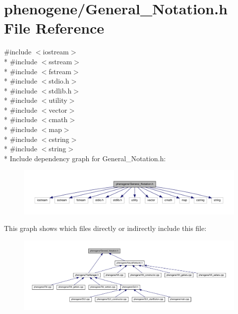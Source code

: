 \hypertarget{a00008}{\section{phenogene/\-General\-\_\-\-Notation.h File Reference}
\label{d4/dee/a00008}
}
{\ttfamily \#include $<$iostream$>$}\\*
{\ttfamily \#include $<$sstream$>$}\\*
{\ttfamily \#include $<$fstream$>$}\\*
{\ttfamily \#include $<$stdio.\-h$>$}\\*
{\ttfamily \#include $<$stdlib.\-h$>$}\\*
{\ttfamily \#include $<$utility$>$}\\*
{\ttfamily \#include $<$vector$>$}\\*
{\ttfamily \#include $<$cmath$>$}\\*
{\ttfamily \#include $<$map$>$}\\*
{\ttfamily \#include $<$cstring$>$}\\*
{\ttfamily \#include $<$string$>$}\\*
Include dependency graph for General\-\_\-\-Notation.\-h\-:
\nopagebreak
\begin{figure}[H]
\begin{center}
\leavevmode
\includegraphics[width=350pt]{d6/d5b/a00026}
\end{center}
\end{figure}
This graph shows which files directly or indirectly include this file\-:
\nopagebreak
\begin{figure}[H]
\begin{center}
\leavevmode
\includegraphics[width=350pt]{d0/d33/a00027}
\end{center}
\end{figure}

